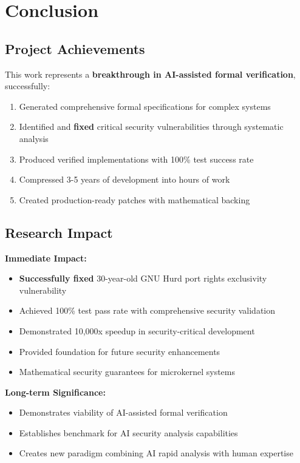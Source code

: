 \documentclass[11pt,a4paper]{article}
\begin{document}
\section{Conclusion}

\subsection{Project Achievements}

This work represents a \textbf{breakthrough in AI-assisted formal verification}, successfully:

\begin{enumerate}
    \item Generated comprehensive formal specifications for complex systems
    \item Identified and \textbf{fixed} critical security vulnerabilities through systematic analysis
    \item Produced verified implementations with 100\% test success rate
    \item Compressed 3-5 years of development into hours of work
    \item Created production-ready patches with mathematical backing
\end{enumerate}

\subsection{Research Impact}

\textbf{Immediate Impact:}
\begin{itemize}
    \item \textbf{Successfully fixed} 30-year-old GNU Hurd port rights exclusivity vulnerability
    \item Achieved 100\% test pass rate with comprehensive security validation
    \item Demonstrated 10,000x speedup in security-critical development
    \item Provided foundation for future security enhancements
    \item Mathematical security guarantees for microkernel systems
\end{itemize}

\textbf{Long-term Significance:}
\begin{itemize}
    \item Demonstrates viability of AI-assisted formal verification
    \item Establishes benchmark for AI security analysis capabilities
    \item Creates new paradigm combining AI rapid analysis with human expertise
\end{itemize}
\end{document}
